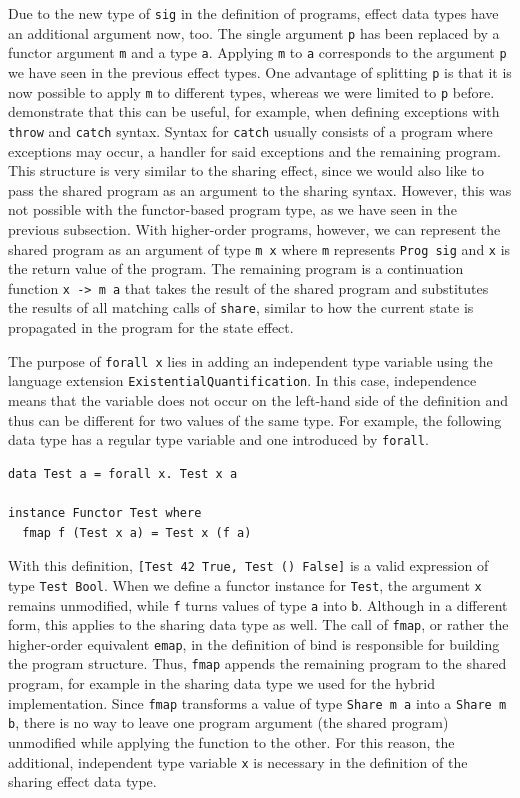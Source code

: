 \documentclass[a4paper, 11pt, fleqn, twoside]{scrreprt}
\newcommand{\hinl}[1]{\texttt{#1}}
\begin{document}
Due to the new type of \hinl{sig} in the definition of programs, effect data types have an additional argument now, too.
The single argument \hinl{p} has been replaced by a functor argument \hinl{m} and a type \hinl{a}.
Applying \hinl{m} to \hinl{a} corresponds to the argument \hinl{p} we have seen in the previous effect types.
One advantage of splitting \hinl{p} is that it is now possible to apply \hinl{m} to different types, whereas we were limited to \hinl{p} before.
\citet{wu2014effect} demonstrate that this can be useful, for example, when defining exceptions with \hinl{throw} and \hinl{catch} syntax.
Syntax for \hinl{catch} usually consists of a program where exceptions may occur, a handler for said exceptions and the remaining program.
This structure is very similar to the sharing effect, since we would also like to pass the shared program as an argument to the sharing syntax.
However, this was not possible with the functor-based program type, as we have seen in the previous subsection.
With higher-order programs, however, we can represent the shared program as an argument of type \hinl{m x} where \hinl{m} represents \hinl{Prog sig} and \hinl{x} is the return value of the program.
The remaining program is a continuation function \hinl{x -> m a} that takes the result of the shared program and substitutes the results of all matching calls of \hinl{share}, similar to how the current state is propagated in the program for the state effect.

The purpose of \hinl{forall x} lies in adding an independent type variable using the language extension \hinl{ExistentialQuantification}.
In this case, independence means that the variable does not occur on the left-hand side of the definition and thus can be different for two values of the same type.
For example, the following data type has a regular type variable and one introduced by \hinl{forall}.

\begin{verbatim}
data Test a = forall x. Test x a

instance Functor Test where
  fmap f (Test x a) = Test x (f a)
\end{verbatim}

With this definition, \hinl{[Test 42 True, Test () False]} is a valid expression of type \hinl{Test Bool}.
When we define a functor instance for \hinl{Test}, the argument \hinl{x} remains unmodified, while \hinl{f} turns values of type \hinl{a} into \hinl{b}.
Although in a different form, this applies to the sharing data type as well.
The call of \hinl{fmap}, or rather the higher-order equivalent \hinl{emap}, in the definition of bind is responsible for building the program structure.
Thus, \hinl{fmap} appends the remaining program to the shared program, for example in the sharing data type we used for the hybrid implementation.
Since \hinl{fmap} transforms a value of type \hinl{Share m a} into a \hinl{Share m b}, there is no way to leave one program argument (the shared program) unmodified while applying the function to the other.
For this reason, the additional, independent type variable \hinl{x} is necessary in the definition of the sharing effect data type.
\end{document}
